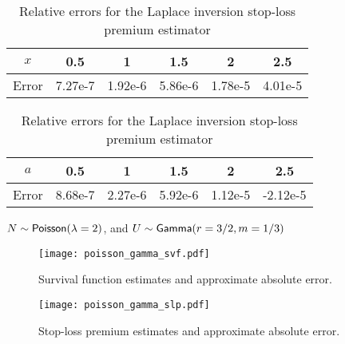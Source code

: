 \begin{table}[H]
\centering
\caption{Relative errors for the Laplace inversion survival function estimator} \vspace{1em}
\begin{tabular}{c|ccccc}
$x$                   & 0.5  & 1  & 1.5  & 2 & 2.5  \\
\hline
Error & 7.27e-7 & 1.92e-6 & 5.86e-6 & 1.78e-5 & 4.01e-5 \\
\end{tabular}
\label{tbl:PascalExponentialSVFTest}

\caption{Relative errors for the Laplace inversion stop-loss premium estimator} \vspace{1em}
\begin{tabular}{c|ccccc}
$a$                   & 0.5  & 1  & 1.5  & 2 & 2.5  \\
\hline
Error & 8.68e-7 & 2.27e-6 & 5.92e-6 & 1.12e-5 & -2.12e-5 \\
\end{tabular}

\label{tbl:PascalExponentialSLPTest}
\end{table}



\begin{test}
$N\sim\mathsf{Poisson}(\lambda=2)$, and $U\sim\mathsf{Gamma}(r=3/2,m=1/3)$
\end{test}

\begin{figure}[H]
\centering
\texttt{[image: poisson\_gamma\_svf.pdf]}
\caption{Survival function estimates and approximate absolute error.}
\end{figure}

\begin{figure}[H]
\centering
\texttt{[image: poisson\_gamma\_slp.pdf]}
\caption{Stop-loss premium estimates and approximate absolute error.}
\end{figure}


